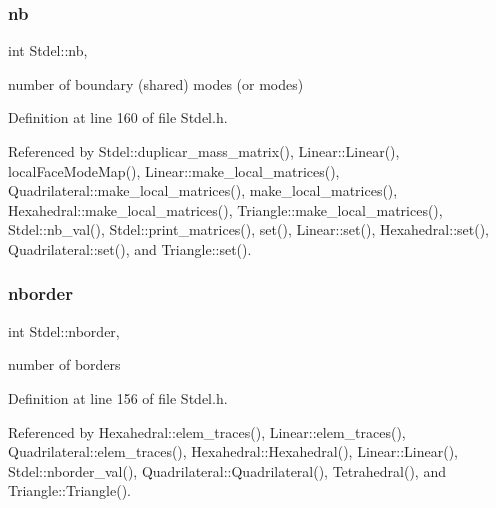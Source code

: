 \mbox{\label{classStdel_ad1d9acc38335d3fd779ba5c14f1507f8}} 
\subsubsection{\texorpdfstring{nb}{nb}}
{\footnotesize\ttfamily int Stdel\+::nb\hspace{0.3cm}{\ttfamily [protected]}, {\ttfamily [inherited]}}



number of boundary (shared) modes (or modes) 



Definition at line 160 of file Stdel.\+h.



Referenced by Stdel\+::duplicar\+\_\+mass\+\_\+matrix(), Linear\+::\+Linear(), local\+Face\+Mode\+Map(), Linear\+::make\+\_\+local\+\_\+matrices(), Quadrilateral\+::make\+\_\+local\+\_\+matrices(), make\+\_\+local\+\_\+matrices(), Hexahedral\+::make\+\_\+local\+\_\+matrices(), Triangle\+::make\+\_\+local\+\_\+matrices(), Stdel\+::nb\+\_\+val(), Stdel\+::print\+\_\+matrices(), set(), Linear\+::set(), Hexahedral\+::set(), Quadrilateral\+::set(), and Triangle\+::set().

\mbox{\label{classStdel_ad0f111a2ba3d9415618c8408da3fc100}} 
\subsubsection{\texorpdfstring{nborder}{nborder}}
{\footnotesize\ttfamily int Stdel\+::nborder\hspace{0.3cm}{\ttfamily [protected]}, {\ttfamily [inherited]}}



number of borders 



Definition at line 156 of file Stdel.\+h.



Referenced by Hexahedral\+::elem\+\_\+traces(), Linear\+::elem\+\_\+traces(), Quadrilateral\+::elem\+\_\+traces(), Hexahedral\+::\+Hexahedral(), Linear\+::\+Linear(), Stdel\+::nborder\+\_\+val(), Quadrilateral\+::\+Quadrilateral(), Tetrahedral(), and Triangle\+::\+Triangle().


